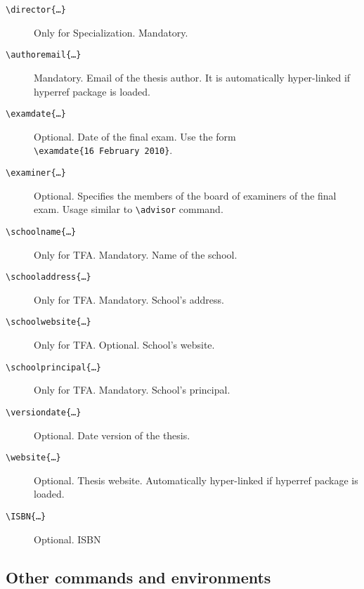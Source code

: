 \documentclass[a5paper,11pt]{article}
\newcommand{\bs}{\textbackslash}
\begin{document}
\begin{description}
\item[\texttt{\bs director\{\dots\}}] Only for Specialization. Mandatory.

\item[\texttt{\bs authoremail\{\dots\}}] Mandatory. Email of the thesis author.
It is automatically hyper-linked if \textsf{hyperref} package is loaded.

\item[\texttt{\bs examdate\{\dots\}}] Optional. Date of the final exam. 
Use the form\\ \texttt{\bs examdate\{16 February 2010\}}.

\item[\texttt{\bs examiner\{\dots\}}] Optional. Specifies the members of the
board of examiners of the final exam. Usage similar to \texttt{\bs advisor} command.

\item[\texttt{\bs schoolname\{\dots\}}] Only for TFA. Mandatory. Name of the school.
\item[\texttt{\bs schooladdress\{\dots\}}] Only for TFA. Mandatory. School's address.
\item[\texttt{\bs schoolwebsite\{\dots\}}] Only for TFA. Optional. School's website.
\item[\texttt{\bs schoolprincipal\{\dots\}}] Only for TFA. Mandatory. School's principal.

\item[\texttt{\bs versiondate\{\dots\}}] Optional. Date version of the thesis.

\item[\texttt{\bs website\{\dots\}}] Optional. Thesis website. Automatically 
hyper-linked if \textsf{hyperref} package is loaded.

\item[\texttt{\bs ISBN\{\dots\}}] Optional. ISBN
\end{description}



\subsection[Other commands\\ and environments]{Other commands and environments}
\end{document}

